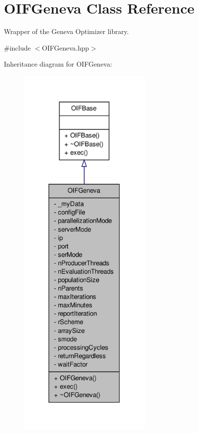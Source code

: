 \hypertarget{classOIFGeneva}{
\section{OIFGeneva Class Reference}
\label{d4/dce/classOIFGeneva}
}


Wrapper of the Geneva Optimizer library.  




{\ttfamily \#include $<$OIFGeneva.hpp$>$}



Inheritance diagram for OIFGeneva:
\nopagebreak
\begin{figure}[H]
\begin{center}
\leavevmode
\includegraphics[width=188pt]{d9/d88/classOIFGeneva__inherit__graph}
\end{center}
\end{figure}


